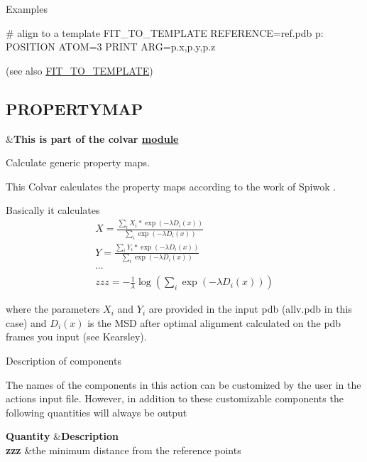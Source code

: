 \begin{DoxyParagraph}{Examples}

\end{DoxyParagraph}
\begin{DoxyVerb}# align to a template
FIT_TO_TEMPLATE REFERENCE=ref.pdb
p: POSITION ATOM=3
PRINT ARG=p.x,p.y,p.z
\end{DoxyVerb}
 (see also \hyperlink{FIT_TO_TEMPLATE}{F\+I\+T\+\_\+\+T\+O\+\_\+\+T\+E\+M\+P\+L\+A\+T\+E}) \hypertarget{PROPERTYMAP}{}\subsection{P\+R\+O\+P\+E\+R\+T\+Y\+M\+A\+P}\label{PROPERTYMAP}
\begin{TabularC}{2}
\hline
&{\bfseries  This is part of the colvar \hyperlink{mymodules}{module }}   \\
\end{TabularC}
Calculate generic property maps.

This Colvar calculates the property maps according to the work of Spiwok \cite{Spiwok:2011ce}.

Basically it calculates \begin{eqnarray} X=\frac{\sum_i X_i*\exp(-\lambda D_i(x))}{\sum_i \exp(-\lambda D_i(x))} \\ Y=\frac{\sum_i Y_i*\exp(-\lambda D_i(x))}{\sum_i \exp(-\lambda D_i(x))} \\ \cdots\\ zzz=-\frac{1}{\lambda}\log(\sum_i \exp(-\lambda D_i(x))) \end{eqnarray}

where the parameters $X_i$ and $Y_i$ are provided in the input pdb (allv.\+pdb in this case) and $D_i(x)$ is the M\+S\+D after optimal alignment calculated on the pdb frames you input (see Kearsley).

\begin{DoxyParagraph}{Description of components}

\end{DoxyParagraph}
The names of the components in this action can be customized by the user in the actions input file. However, in addition to these customizable components the following quantities will always be output

\begin{TabularC}{2}
\hline
{\bfseries  Quantity }  &{\bfseries  Description }   \\
{\bfseries  zzz } &the minimum distance from the reference points   \\
\end{TabularC}



